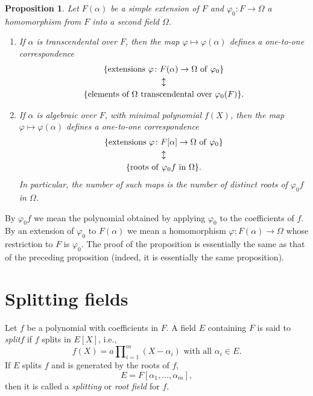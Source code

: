 \documentclass[a4paper,11pt,final,openany]{memoir}
\newtheorem{proposition}[X]{Proposition}
\theoremstyle{nonumberplain}
\begin{document}
\begin{proposition}
\label{sf2} Let $F(\alpha)$ be a simple extension of $F$ and $\varphi
_{0}\colon F\rightarrow\Omega$ a homomorphism from $F$ into a second field
$\Omega$.

\begin{enumerate}
\item If $\alpha$ is transcendental over $F$, then the map $\varphi
\mapsto\varphi(\alpha)$ defines a one-to-one correspondence
\begin{gather*}
\{\text{extensions }\varphi\colon F(\alpha)\rightarrow\Omega\text{\textrm{\ of
}}\varphi_{0}\}\\
\updownarrow\\
\{\text{elements of }\Omega
\text{\textrm{\ transcendental over }}\varphi_{0}(F)\}.
\end{gather*}


\item If $\alpha$ is algebraic over $F$, with minimal polynomial $f(X)$, then
the map $\varphi\mapsto\varphi(\alpha)$ defines a one-to-one correspondence
\begin{gather*}
\{\text{extensions }\varphi\colon F[\alpha]\rightarrow\Omega\text{\textrm{\ of
}}\varphi_{0}\}\\
\updownarrow\\
\{\text{\textrm{roots of }}\varphi_{0}f\text{ in
}\Omega\}.
\end{gather*}
In particular, the number of such maps is the number of distinct roots of
$\varphi_{0}f$ in $\Omega$.
\end{enumerate}
\end{proposition}

By $\varphi_{0}f$ we mean the polynomial obtained by applying $\varphi_{0}$ to
the coefficients of $f$. By an extension of $\varphi_{0}$ to $F(\alpha)$ we
mean a homomorphism $\varphi\colon F(\alpha)\rightarrow\Omega$ whose
restriction to $F$ is $\varphi_{0}$. The proof of the proposition is
essentially the same as that of the preceding proposition (indeed, it is
essentially the same proposition).

\section{Splitting fields}

Let $f$ be a polynomial with coefficients in $F$. A field $E$ containing $F$
is said to
%
\emph{split}$f$ if $f$ splits in $E[X]$, i.e.,
\[
f(X)=a\prod\nolimits_{i=1}^{m}(X-\alpha_{i})\text{ with all }\alpha_{i}\in E.
\]
If $E$ splits $f$ and is generated by the roots of $f$,
\[
E=F[\alpha_{1},\ldots,\alpha_{m}],
\]
then it is called a \emph{splitting} or \emph{root field}%
for $f$.
\end{document}
